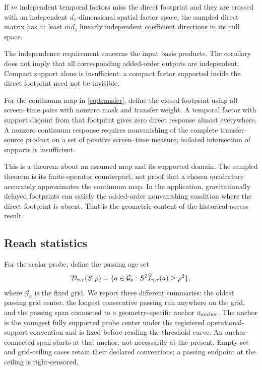 \begin{corollary}\label{cor:dimension}
If $m$ independent temporal factors miss the direct footprint and they are crossed with an independent $d_s$-dimensional spatial factor space, the sampled direct matrix has at least $md_s$ linearly independent coefficient directions in its null space.
\end{corollary}
The independence requirement concerns the input basis products. The corollary does not imply that all corresponding added-order outputs are independent. Compact support alone is insufficient: a compact factor supported inside the direct footprint need not be invisible.

\begin{corollary}\label{cor:continuum}
For the continuum map in \eqref{eq:transfer}, define the closed footprint using all screen--time pairs with nonzero mask and transfer weight. A temporal factor with support disjoint from that footprint gives zero direct response almost everywhere. A nonzero continuum response requires nonvanishing of the complete transfer--source product on a set of positive screen--time measure; isolated intersection of supports is insufficient.
\end{corollary}
This is a theorem about an assumed map and its supported domain. The sampled theorem is its finite-operator counterpart, not proof that a chosen quadrature accurately approximates the continuum map. In the application, gravitationally delayed footprints can satisfy the added-order nonvanishing condition where the direct footprint is absent. That is the geometric content of the historical-access result.

\subsection{Reach statistics}
For the scalar probe, define the passing age set
\begin{equation}
\mathcal D_{\gamma,r}(S,\rho)
=\{a\in\mathcal G_a:S^2\widehat{\mathcal I}_{\gamma,r}(a)\geq\rho^2\},
\label{eq:ageset}
\end{equation}
where $\mathcal G_a$ is the fixed grid. We report three different summaries: the oldest passing grid center, the longest consecutive passing run anywhere on the grid, and the passing span connected to a geometry-specific anchor $a_{\rm anchor}$. The anchor is the youngest fully supported probe center under the registered operational-support convention and is fixed before reading the threshold curve. An anchor-connected span starts at that anchor, not necessarily at the present. Empty-set and grid-ceiling cases retain their declared conventions; a passing endpoint at the ceiling is right-censored.

